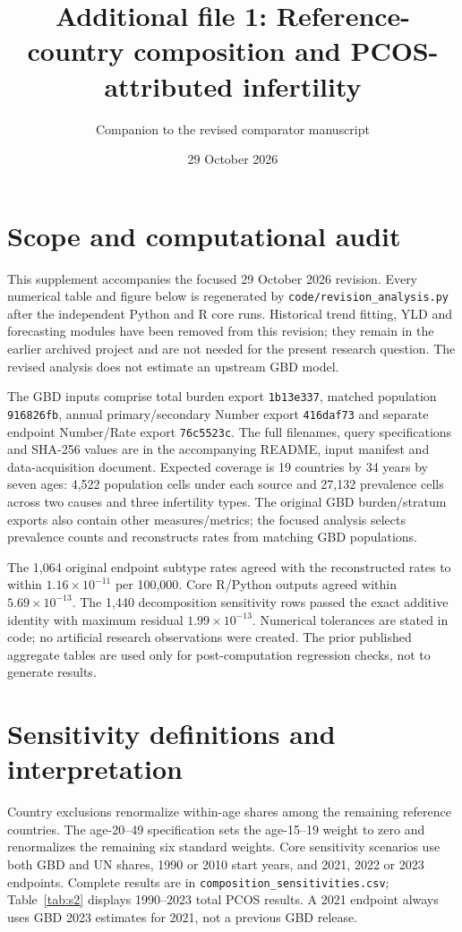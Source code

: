 \documentclass[11pt,a4paper]{article}
\title{Additional file 1: Reference-country composition and PCOS-attributed infertility}
\author{Companion to the revised comparator manuscript}
\date{29 October 2026}
\begin{document}
\maketitle
\renewcommand{\thetable}{S\arabic{table}}\setcounter{table}{0}
\renewcommand{\thefigure}{S\arabic{figure}}\setcounter{figure}{0}
\section{Scope and computational audit}
This supplement accompanies the focused 29 October 2026 revision. Every numerical table and figure below is regenerated by \texttt{code/revision\_analysis.py} after the independent Python and R core runs. Historical trend fitting, YLD and forecasting modules have been removed from this revision; they remain in the earlier archived project and are not needed for the present research question. The revised analysis does not estimate an upstream GBD model.

The GBD inputs comprise total burden export \texttt{1b13e337}, matched population \texttt{916826fb}, annual primary/secondary Number export \texttt{416daf73} and separate endpoint Number/Rate export \texttt{76c5523c}. The full filenames, query specifications and SHA-256 values are in the accompanying README, input manifest and data-acquisition document. Expected coverage is 19 countries by 34 years by seven ages: 4,522 population cells under each source and 27,132 prevalence cells across two causes and three infertility types. The original GBD burden/stratum exports also contain other measures/metrics; the focused analysis selects prevalence counts and reconstructs rates from matching GBD populations.

The 1,064 original endpoint subtype rates agreed with the reconstructed rates to within $1.16\times10^{-11}$ per 100,000. Core R/Python outputs agreed within $5.69\times10^{-13}$. The 1,440 decomposition sensitivity rows passed the exact additive identity with maximum residual $1.99\times10^{-13}$. Numerical tolerances are stated in code; no artificial research observations were created. The prior published aggregate tables are used only for post-computation regression checks, not to generate results.

\section{Sensitivity definitions and interpretation}
Country exclusions renormalize within-age shares among the remaining reference countries. The age-20--49 specification sets the age-15--19 weight to zero and renormalizes the remaining six standard weights. Core sensitivity scenarios use both GBD and UN shares, 1990 or 2010 start years, and 2021, 2022 or 2023 endpoints. Complete results are in \texttt{composition\_sensitivities.csv}; Table~\ref{tab:s2} displays 1990--2023 total PCOS results. A 2021 endpoint always uses GBD 2023 estimates for 2021, not a previous GBD release.
\end{document}
